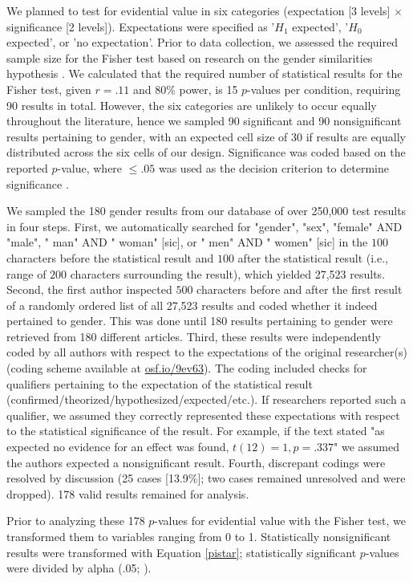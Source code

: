 \documentclass{article}
\begin{document}
We planned to test for evidential value in six categories (expectation [3 levels] $\times$ significance [2 levels]). Expectations were specified as '$H_1$ expected', '$H_0$ expected', or 'no expectation'. Prior to data collection, we assessed the required sample size for the Fisher test based on research on the gender similarities hypothesis \cite{Hyde2005-gj}. We calculated that the required number of statistical results for the Fisher test, given $r=.11$ \cite{Hyde2005-gj} and 80\% power, is 15 $p$-values per condition, requiring 90 results in total. However, the six categories are unlikely to occur equally throughout the literature, hence we sampled 90 significant and 90 nonsignificant results pertaining to gender, with an expected cell size of 30 if results are equally distributed across the six cells of our design. Significance was coded based on the reported $p$-value, where $\leq.05$ was used as the decision criterion to determine significance \cite{Nuijten2015-od}.

We sampled the 180 gender results from our database of over 250,000 test results in four steps. First, we automatically searched for "gender", "sex", "female" AND "male", " man" AND " woman" [sic], or " men" AND " women" [sic] in the $100$ characters before the statistical result and $100$ after the statistical result (i.e., range of $200$ characters surrounding the result), which yielded 27,523 results. Second, the first author inspected $500$ characters before and after the first result of a randomly ordered list of all 27,523 results and coded whether it indeed pertained to gender. This was done until 180 results pertaining to gender were retrieved from 180 different articles. Third, these results were independently coded by all authors with respect to the expectations of the original researcher(s) (coding scheme available at \url{osf.io/9ev63}). The coding included checks for qualifiers pertaining to the expectation of the statistical result (confirmed/theorized/hypothesized/expected/etc.). If researchers reported such a qualifier, we assumed they correctly represented these expectations with respect to the statistical significance of the result. For example, if the text stated "as expected no evidence for an effect was found, $t(12)=1, p=.337$" we assumed the authors expected a nonsignificant result. Fourth, discrepant codings were resolved by discussion (25 cases [13.9\%]; two cases remained unresolved and were dropped). 178 valid results remained for analysis.

Prior to analyzing these 178 $p$-values for evidential value with the Fisher test, we transformed them to variables ranging from 0 to 1. Statistically nonsignificant results were transformed with Equation \ref{pistar}; statistically significant $p$-values were divided by alpha (.05; \cite{Van_Assen2015-gg,Simonsohn2014-dm}).
\end{document}
